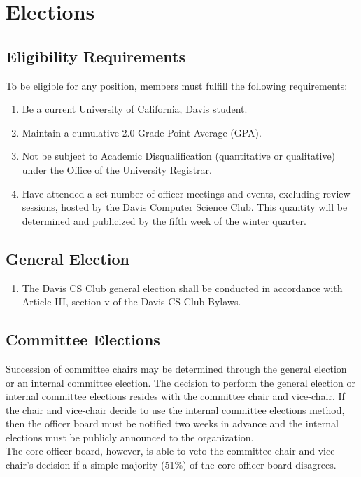 \documentclass{article}
\newenvironment{li}{
\begin{enumerate}
  \setlength{\itemsep}{1pt}
  \setlength{\parskip}{0pt}
  \setlength{\parsep}{0pt}
}{\end{enumerate}}
\begin{document}
\section{Elections}

\subsection{Eligibility Requirements}
To be eligible for any position, members must fulfill the following requirements:
\begin{li}
\item Be a current University of California, Davis student.
\item Maintain a cumulative 2.0 Grade Point Average (GPA).
\item Not be subject to Academic Disqualification (quantitative or qualitative) under the Office of the University Registrar.
\item Have attended a set number of officer meetings and events, excluding review sessions, hosted by the Davis Computer Science Club. This quantity will be determined and publicized by the fifth week of the winter quarter.
\end{li}

\subsection{General Election}
\begin{li}
\item The Davis CS Club general election shall be conducted in accordance with Article III, section v of the Davis CS Club Bylaws.
\end{li}

\subsection{Committee Elections}
Succession of committee chairs may be determined through the general election or an internal committee election. The decision to perform the general election or internal committee elections resides with the committee chair and vice-chair. If the chair and vice-chair decide to use the internal committee elections method, then the officer board must be notified two weeks in advance and the internal elections must be publicly announced to the organization. \\

\noindent The core officer board, however, is able to veto the committee chair and vice-chair's decision if a simple majority (51\%) of the core officer board disagrees.
\end{document}
